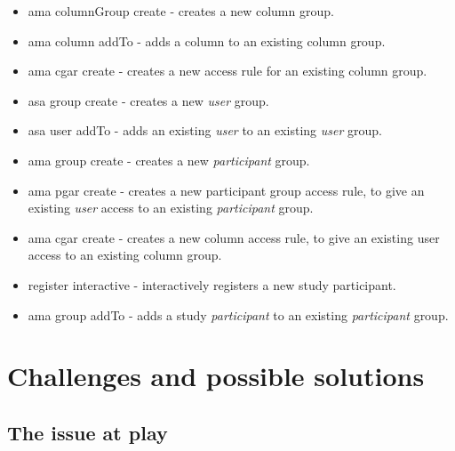 \documentclass{report}
\begin{document}
\begin{itemize}
		\item ama columnGroup create - creates a new column group.
		\item ama column addTo - adds a column to an existing column group.
		\item ama cgar create - creates a new access rule for an existing column group.
		\item asa group create - creates a new \textit{user} group.
		\item asa user addTo - adds an existing \textit{user} to an existing \textit{user} group.
		\item ama group create - creates a new \textit{participant} group.
		\item ama pgar create - creates a new participant group access rule, to give an existing \textit{user} access to an existing \textit{participant} group.
		\item ama cgar create - creates a new column access rule, to give an existing user access to an existing column group.
		\item register interactive - interactively registers a new study participant.
		\item ama group addTo - adds a study \textit{participant} to an existing \textit{participant} group.
\end{itemize}


\chapter{Challenges and possible solutions}
\section{The issue at play}
\end{document}
